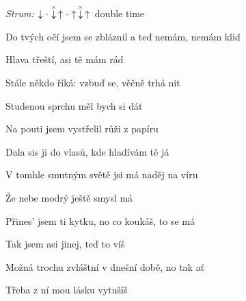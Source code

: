 \begin{song}


\begin{headerbox}
\RaiseBoxWithChucks
\textit{Strum:} $\Down\Miss\ChuckDown\Up\Miss\Up\ChuckDown\Up$ double time
\end{headerbox}

\begin{hchordbox}
\end{hchordbox}

\Large

\bigskip

Do tvých očí jsem se zbláznil a teď nemám, nemám klid \par
{} Hlava třeští, asi tě mám rád \par
{} Stále někdo říká: vzbuď se, věčně trhá nit \par
{} Studenou sprchu měl bych si dát \par

\bigskip

\begin{chorusbox}{\Refren}
 Na pouti jsem vystřelil růži z papíru \par
{} Dala sis ji do vlasů, kde hladívám tě já \par
{} V tomhle smutným světě jsi má naděj na víru \par
Že nebe modrý ještě smysl má \par
\end{chorusbox}

\bigskip

 Přines' jsem ti kytku, no co koukáš, to se má \par
{} Tak jsem asi jinej, teď to víš \par
{} Možná trochu zvláštní v dnešní době, no tak ať \par
{} Třeba z ní mou lásku vytušíš \par

\bigskip

\Refren {}

\end{song}
